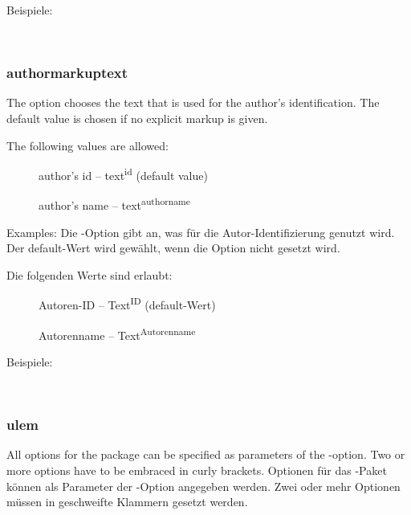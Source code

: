 		Beispiele:
	\fi

\\

\subsubsection{authormarkuptext}
\ifENGLISH
	The  option chooses the text that is used for the author's identification.
	The default value is chosen if no explicit markup is given.

	The following values are allowed:
	\begin{description}
		\item [] author's id -- text\textsuperscript{id} (default value)
		\item [] author's name -- text\textsuperscript{authorname}
	\end{description}

	Examples:
\fi
	\ifGERMAN
		Die -Option gibt an, was für die Autor-Identifizierung genutzt wird.
		Der default-Wert wird gewählt, wenn die Option nicht gesetzt wird.

		Die folgenden Werte sind erlaubt:
		\begin{description}
			\item [] Autoren-ID -- Text\textsuperscript{ID} (default-Wert)
			\item [] Autorenname -- Text\textsuperscript{Autorenname}
		\end{description}

		Beispiele:
	\fi

\\

\subsubsection{ulem}
\ifENGLISH
	All options for the  package can be specified as parameters of the -option.
	Two or more options have to be embraced in curly brackets.
\fi
	\ifGERMAN
		Optionen für das -Paket können als Parameter der -Option angegeben werden.
		Zwei oder mehr Optionen müssen in geschweifte Klammern gesetzt werden.
	\fi

